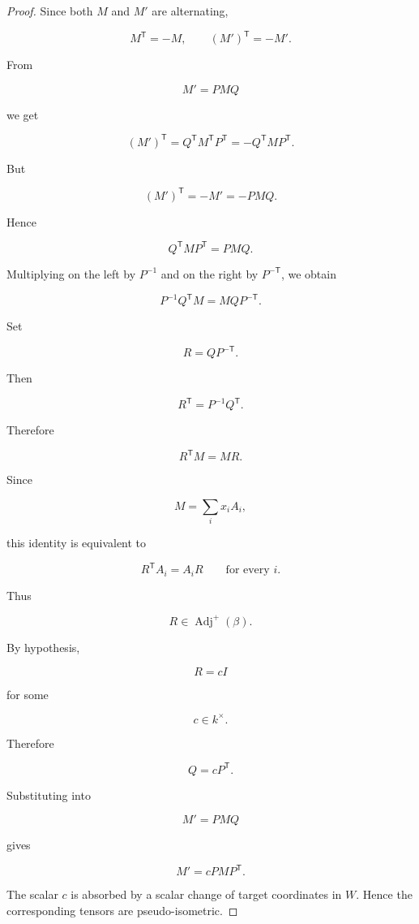 \documentclass[11pt]{article}
\begin{document}
\begin{proof}

Since both $M$ and $M'$ are alternating,

\[
M^{\mathsf T}=-M,
\qquad
(M')^{\mathsf T}=-M'.
\]

From

\[
M'=PMQ
\]

we get

\[
(M')^{\mathsf T}
=
Q^{\mathsf T}M^{\mathsf T}P^{\mathsf T}
=
-Q^{\mathsf T}MP^{\mathsf T}.
\]

But

\[
(M')^{\mathsf T}=-M'=-PMQ.
\]

Hence

\[
Q^{\mathsf T}MP^{\mathsf T}=PMQ.
\]

Multiplying on the left by $P^{-1}$ and on the right by $P^{-\mathsf T}$, we obtain

\[
P^{-1}Q^{\mathsf T}M
=
M QP^{-\mathsf T}.
\]

Set

\[
R=QP^{-\mathsf T}.
\]

Then

\[
R^{\mathsf T}=P^{-1}Q^{\mathsf T}.
\]

Therefore

\[
R^{\mathsf T}M=MR.
\]

Since

\[
M=\sum_i x_iA_i,
\]

this identity is equivalent to

\[
R^{\mathsf T}A_i=A_iR
\qquad
\text{for every }i.
\]

Thus

\[
R\in\operatorname{Adj}^+(\beta).
\]

By hypothesis,

\[
R=cI
\]

for some

\[
c\in k^\times.
\]

Therefore

\[
Q=cP^{\mathsf T}.
\]

Substituting into

\[
M'=PMQ
\]

gives

\[
M'=c P M P^{\mathsf T}.
\]

The scalar $c$ is absorbed by a scalar change of target coordinates in $W$. Hence the corresponding tensors are pseudo-isometric.

\end{proof}
\end{document}
